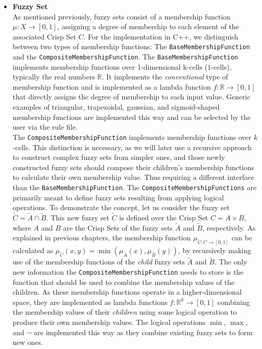 \begin{itemize}
  \item \textbf{Fuzzy Set} \\
        As mentioned previously, fuzzy sets consist of a membership function $\mu: X \rightarrow [0, 1]$, assigning a degree of membership to each element of the associated Crisp Set $C$. For the implementation in C++, we distinguish between two types of membership functions: The \texttt{BaseMembershipFunction} and the \texttt{CompositeMembershipFunction}. The \texttt{BaseMembershipFunction} implements membership functions over 1-dimensional k-cells ($1$-cells), typically the real numbers $\mathbb{R}$. It implements the \emph{conventional} type of membership function and is implemented as a lambda function $f: \mathbb{R} \rightarrow [0, 1]$ that directly assigns the degree of membership to each input value. Generic examples of triangular, trapezoidal, gaussian, and sigmoid-shaped membership functions are implemented this way and can be selected by the user via the rule file. \\
        \smallskip
        The \texttt{CompositeMembershipFunction} implements membership functions over  $k$-cells. This distinction is necessary, as we will later use a recursive approach to construct complex fuzzy sets from simpler ones, and those newly constructed fuzzy sets should compose their children's membership functions to calculate their own membership value. Thus requiring a different interface than the \texttt{BaseMembershipFunction}. The \texttt{CompositeMembershipFunctions} are primarily meant to define fuzzy sets resulting from applying logical operations. To demonstrate the concept, let us consider the fuzzy set $\tilde{C} = \tilde{A} \cap \tilde{B}$. This new fuzzy set $\tilde{C}$ is defined over the Crisp Set $C = A \times B$, where $A$ and $B$ are the Crisp Sets of the fuzzy sets $\tilde{A}$ and $\tilde{B}$, respectively. As explained in previous chapters, the membership function $\mu_{\tilde{C} : C \rightarrow [0, 1]}$ can be calculated as $\mu_{\tilde{C}}(x, y) = \min(\mu_{\tilde{A}}(x), \mu_{\tilde{B}}(y))$, by recursively making use of the membership functions of the \emph{child} fuzzy sets $\tilde{A}$ and $\tilde{B}$. The only new information the \texttt{CompositeMembershipFunction} needs to store is the function that should be used to combine the membership values of the children. As these membership functions operate in a higher-dimensional space, they are implemented as lambda functions $f: \mathbb{R}^k \rightarrow [0, 1]$ combining the membership values of their \emph{children} using some logical operation to produce their own membership values. The logical operations $\min$, $\max$, and $\neg$ are implemented this way as they combine existing fuzzy sets to form new ones. \\

\end{itemize}
